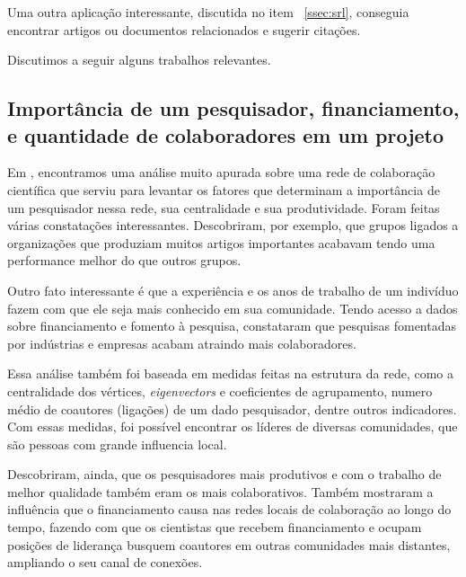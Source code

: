 Uma outra aplicação interessante, discutida no item ~\ref{ssec:srl}, conseguia encontrar artigos ou documentos relacionados e sugerir citações.

Discutimos a seguir alguns trabalhos relevantes.

\subsection{Importância de um pesquisador, financiamento, e quantidade de colaboradores em um projeto}
\label{ssec:importance}

Em \citet{Ebadi2015}, encontramos uma análise muito apurada sobre uma rede de colaboração científica que serviu para levantar os fatores que determinam a importância de um pesquisador nessa rede, sua centralidade e sua produtividade. Foram feitas várias constatações interessantes. Descobriram, por exemplo, que grupos ligados a organizações que produziam muitos artigos importantes acabavam tendo uma performance melhor do que outros grupos.

Outro fato interessante é que a experiência e os anos de trabalho de um indivíduo fazem com que ele seja mais conhecido em sua comunidade. Tendo acesso a dados sobre financiamento e fomento à pesquisa, constataram que pesquisas fomentadas por indústrias e empresas acabam atraindo mais colaboradores.

Essa análise também foi baseada em medidas feitas na estrutura da rede, como a centralidade dos vértices, \textit{eigenvectors} e coeficientes de agrupamento, numero médio de coautores (ligações) de um dado pesquisador, dentre outros indicadores. Com essas medidas, foi possível encontrar os líderes de diversas comunidades, que são pessoas com grande influencia local.

Descobriram, ainda, que os pesquisadores mais produtivos e com o trabalho de melhor qualidade também eram os mais colaborativos. Também mostraram a influência que o financiamento causa nas redes locais de colaboração ao longo do tempo, fazendo com que os cientistas que recebem financiamento e ocupam posições de liderança busquem coautores em outras comunidades mais distantes, ampliando o seu canal de conexões.



